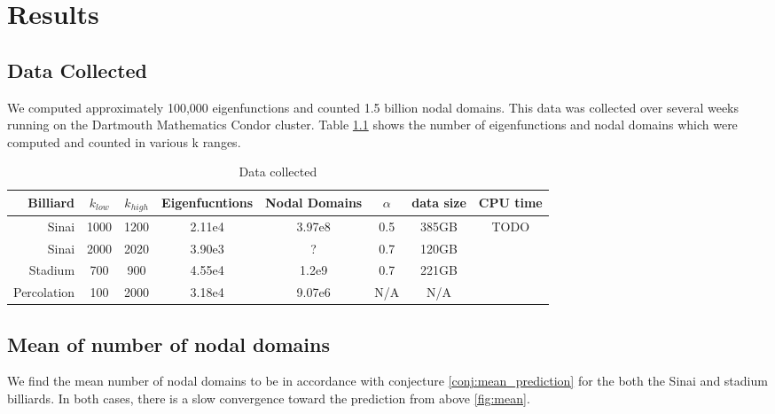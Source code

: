 \documentclass{report}
\begin{document}
\chapter{Results}

\section{Data Collected}
We computed approximately 100,000 eigenfunctions and counted 1.5 billion nodal domains. This data was collected over several weeks running on the Dartmouth Mathematics Condor cluster. Table \ref{tab:data_collected} shows the number of eigenfunctions and nodal domains which were computed and counted in various k ranges.

\begin{table}
  \centering
  \begin{tabular}{|r|c|c|c|c|c|c|c|}
    \hline
    Billiard & $k_{low}$ & $k_{high}$ & Eigenfucntions & Nodal Domains & $\alpha$ & data size & CPU time \\ \hline
    \hline
    Sinai       & 1000 & 1200 & 2.11e4 & 3.97e8 & 0.5 & 385GB & TODO \\ \hline
    Sinai       & 2000 & 2020 & 3.90e3 & ?      & 0.7 & 120GB & \\ \hline
    Stadium     & 700  & 900  & 4.55e4 & 1.2e9  & 0.7 & 221GB & \\ \hline
    Percolation & 100  & 2000 & 3.18e4 & 9.07e6 & N/A & N/A   & \\ \hline
  \end{tabular}
  \caption{Data collected}
  \label{tab:data_collected}
\end{table}



\section{Mean of number of nodal domains}
We find the mean number of nodal domains to be in accordance with conjecture \ref{conj:mean_prediction} for the both the Sinai and stadium billiards. In both cases, there is a slow convergence toward the prediction from above \ref{fig:mean}.

\end{document}
